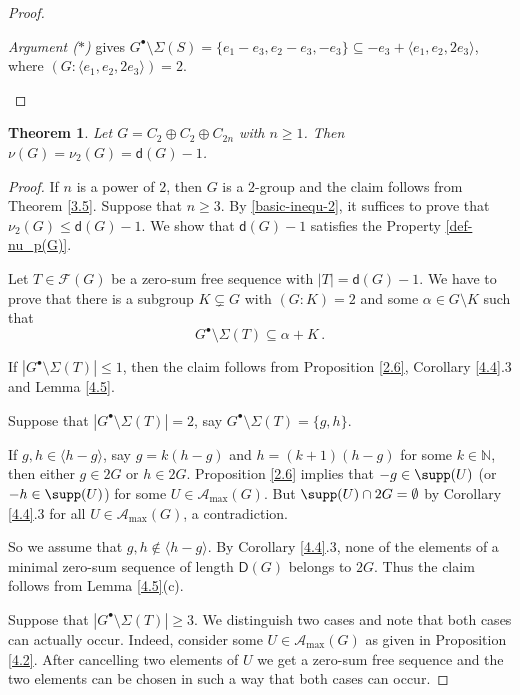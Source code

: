 \documentclass[a4paper, 10pt]{amsart}
\theoremstyle{plain}
\newtheorem{theorem}{\bf Theorem}[section]
\theoremstyle{definition}
\newcommand{\N}{\mathbb N}
\numberwithin{equation}{section}
\begin{document}
{\begin{proof}
\begin{itemize}
{\it Argument ($*$)} gives $G^{\bullet}\setminus\Sigma(S)=\{e_1-e_3,e_2-e_3,-e_3\}\subseteq-e_3+\langle e_1,e_2,2e_3\rangle$, where $(G:\langle e_1,e_2,2e_3\rangle)=2$. \qedhere
\end{itemize}
\end{proof}

\begin{theorem} \label{4.7}
Let $G = C_2 \oplus C_2 \oplus C_{2n}$ with $n\geq 1$. Then $\nu (G) = \nu_2 (G) = \mathsf d (G)-1$.
\end{theorem}

\begin{proof}
If $n$ is a power of $2$, then $G$ is a $2$-group and the claim follows from  Theorem \ref{3.5}. Suppose that  $n\ge 3$. 
	By \eqref{basic-inequ-2}, it suffices to prove that $\nu_2 (G) \le \mathsf d (G)-1$.
We show that $\mathsf d (G)-1$ satisfies the Property  \eqref{def-nu_p(G)}. 

Let $T \in \mathcal F(G)$ be a zero-sum free sequence with $|T|=\mathsf d (G)-1$. We have to prove that there is a subgroup $K \subsetneq G$ with $(G : K)=2$ and some $\alpha \in G \setminus K$ such that
\[
G^{\bullet} \setminus \Sigma (T) \subseteq \alpha + K \,.
\]


If $|G^{\bullet}\setminus \Sigma (T)| \le 1$, then the claim follows from Proposition \ref{2.6}, Corollary \ref{4.4}.3 and Lemma \ref{4.5}. 

\smallskip
Suppose that  $|G^{\bullet}\setminus \Sigma (T)|=2$, say  $G^{\bullet}\setminus \Sigma (T)=\{g,h\}$. 

If $g,h\in \langle h-g \rangle$,  say $g=k(h-g)$ and $h= (k+1) (h-g)$ for some $k \in \N$, then either  $g \in 2G$ or $h \in 2G$. Proposition \ref{2.6} implies that $-g \in \supp (U)$ (or $-h \in \supp (U)$) for some $U \in \mathcal A_{\max} (G)$. But $\supp (U) \cap 2G = \emptyset$ by Corollary \ref{4.4}.3 for all $U\in \mathcal A_{\max} (G)$,  a contradiction.

So we assume that $g,h\notin \langle h-g \rangle$. By Corollary \ref{4.4}.3, none of the elements of a minimal zero-sum sequence of length $\mathsf D(G)$ belongs to $2G$. Thus the claim follows from Lemma \ref{4.5}(c).

Suppose that $|G^{\bullet}\setminus \Sigma (T)| \ge 3$. We distinguish two cases and note that both cases can actually occur. Indeed, consider some $U \in \mathcal A_{\max} (G)$ as given in Proposition \ref{4.2}. After cancelling two elements of $U$ we get a zero-sum free sequence and the two elements can be chosen in such a way that both cases can occur.


\end{proof}}
\end{document}
